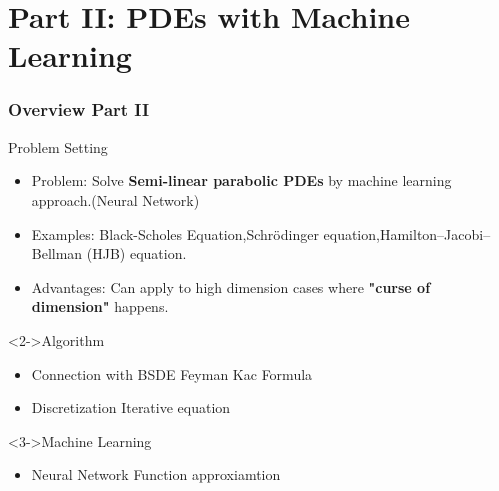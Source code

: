 \documentclass[mathserif,10pt]{beamer}
\renewcommand{\alert}[1]{\textcolor{MyRed}{#1}\xspace}
\renewcommand{\emph}[1]{\textbf{#1}\xspace}
\newcommand{\inStructColor}[1]{\textcolor{MyNewDelftBlue}{#1}}
\begin{document}
\section{Part II: PDEs with Machine Learning}
\begin{frame}
\frametitle{Overview Part II}
\begin{block}{Problem Setting}
\begin{itemize}
\item 
\inStructColor{Problem:} Solve \emph{Semi-linear parabolic PDEs } by machine learning approach.(Neural Network)  %
\item
\inStructColor{Examples:} Black-Scholes Equation,Schrödinger equation,Hamilton–Jacobi–Bellman (HJB) equation.
\item
\inStructColor{Advantages:} Can apply to high dimension cases where \emph{"curse of dimension"} happens. 
\end{itemize}
\end{block}
\begin{block}<2->{Algorithm}
\begin{itemize}
\item 
\inStructColor{Connection with BSDE }  Feyman Kac Formula\\

\item 
\inStructColor{Discretization} Iterative equation 
\end{itemize}
\end{block}
\begin{block}<3->{Machine Learning}
\begin{itemize}
\item \inStructColor{Neural Network} Function approxiamtion
\end{itemize}
\end{block}
\end{frame}
\end{document}
